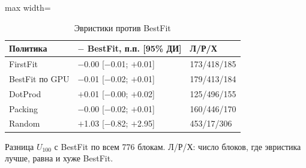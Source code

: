 \begin{table}[htbp]
\centering
\small
\caption{Эвристики против BestFit}
\label{tab:heur}
\begin{adjustbox}{max width=\textwidth}
\begin{tabular}{lll}
\toprule
Политика & \(-\) BestFit, п.п. [95\% ДИ] & Л/Р/Х \\
\midrule
FirstFit & \(-\)0.00 [\(-\)0.01; \(+\)0.01] & 173/418/185 \\
BestFit по GPU & \(-\)0.01 [\(-\)0.02; \(+\)0.01] & 179/413/184 \\
DotProd & \(+\)0.01 [\(-\)0.00; \(+\)0.02] & 125/496/155 \\
Packing & \(-\)0.00 [\(-\)0.02; \(+\)0.01] & 160/446/170 \\
Random & \(+\)1.03 [\(-\)0.82; \(+\)2.95] & 453/17/306 \\
\bottomrule
\end{tabular}
\end{adjustbox}
\par\smallskip
\parbox{0.95\textwidth}{\footnotesize Разница \(U_{100}\) с BestFit по всем 776 блокам. Л/Р/Х: число блоков, где эвристика лучше, равна и хуже BestFit.}
\end{table}
